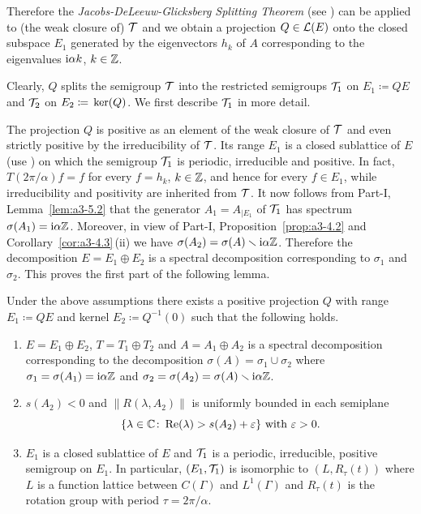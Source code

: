 Therefore the \emph{Jacobs-DeLeeuw-Glicksberg Splitting Theorem} (see \textcite[Chapter 2, Theorem 4.4 and 4.5]{krengel:1985}) can be applied to (the weak closure of) $\mathcal{T}$ and we obtain a projection $Q \in \mathcal{L}(E)$ onto the closed subspace $E_{1}$ generated by the eigenvectors $h_{k}$ of\/ $A$ corresponding to the eigenvalues $\mathrm{i}\alpha k$, $k \in \mathbb{Z}$.

Clearly, $Q$ splits the semigroup $\mathcal{T}$ into the restricted semigroups $\mathcal{T}_{1}$ on $E_{1} \coloneqq QE$ and $\mathcal{T}_{2}$ on $E_{2} \coloneqq \mathop{}\mathrm{ker}(Q)$.
We first describe $\mathcal{T}_{1}$ in more detail.

The projection $Q$ is positive as an element of the weak closure of\/ $\mathcal{T}$ and even strictly positive by the irreducibility of\/ $\mathcal{T}$.
Its range $E_{1}$ is a closed sublattice of\/ $E$ (use \textcite[Proposition III.11.5]{schaefer:1974}) on which the semigroup $\mathcal{T}_{1}$ is periodic, irreducible and positive.
In fact, $T(2\pi/\alpha)f = f$ for every $f = h_{k}$, $k \in \mathbb{Z}$, and hence for every $f \in E_{1}$, while irreducibility and positivity are inherited from $\mathcal{T}$.
It now follows from 
Part-I, Lemma~\ref{lem:a3-5.2}
that the generator $A_{1} = A_{|E_{1}}$ of\/ $\mathcal{T}_{1}$ has spectrum $\sigma(A_{1}) = \mathrm{i}\alpha\mathbb{Z}$.
Moreover, in view of 
Part-I, Proposition~\ref{prop:a3-4.2} and Corollary~\ref{cor:a3-4.3}\,(ii) 
we have $\sigma(A_{2}) = \sigma(A) \smallsetminus \mathrm{i}\alpha\mathbb{Z}$.
Therefore the decomposition $E = E_{1} \oplus E_{2}$ is a spectral decomposition corresponding to $\sigma_{1}$ and $\sigma_{2}$.
This proves the first part of the following lemma.
\begin{lemma}\label{lem:c4-2.12}%
Under the above assumptions there exists a positive projection $Q$ with range $E_{1} \coloneqq QE$ and kernel $E_{2} \coloneqq Q^{-1}(0)$ such that the following holds.
\begin{enumerate}[\upshape (i)]
\item \label{lem:c4-2.12-1}
$E = E_{1} \oplus E_{2}$, $T = T_{1} \oplus T_{2}$ and $A = A_{1} \oplus A_{2}$ is a spectral decomposition corresponding to the decomposition $\sigma(A) = \sigma_{1} \cup \sigma_{2}$ where $\sigma_{1} = \sigma(A_{1}) = \mathrm{i}\alpha\mathbb{Z}$ and $\sigma_{2} = \sigma(A_{2}) = \sigma(A) \smallsetminus \mathrm{i}\alpha\mathbb{Z}$.

\item \label{lem:c4-2.12-2}
$s(A_{2}) < 0$ and $\|R(\lambda,A_{2})\|$ is uniformly bounded in each semiplane
\[
\{\lambda \in \C \colon \Re(\lambda) > s(A_{2}) + \epsilon\} \text{ with } \epsilon > 0.
\]

\item \label{lem:c4-2.12-3}
$E_{1}$ is a closed sublattice of\/ $E$ and $\mathcal{T}_{1}$ is a periodic, irreducible, positive semigroup on $E_{1}$.
In particular, $(E_{1},\mathcal{T}_{1})$ is isomorphic to $(L,R_{\tau}(t))$ where $L$ is a function lattice between $C(\Gamma)$ and $L^{1}(\Gamma)$ and $R_{\tau}(t)$ is the rotation group with period $\tau = 2\pi/\alpha$.
\end{enumerate}
\end{lemma}
